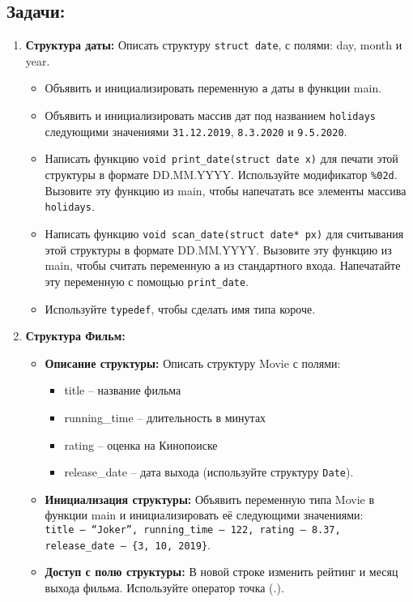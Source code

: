 \documentclass{article}
\begin{document}
\subsection*{Задачи:}
\begin{enumerate}
\item \textbf{Структура даты:} Описать структуру \texttt{struct date}, с полями: day, month и year. 
\begin{itemize}
\item Объявить и инициализировать переменную \texttt{a} даты в функции main.
\item Объявить и инициализировать массив дат под названием \texttt{holidays} следующими значениями \texttt{31.12.2019}, \texttt{8.3.2020} и \texttt{9.5.2020}.
\item Написать функцию \texttt{void print\_date(struct date x)} для печати этой структуры в формате DD.MM.YYYY. Используйте модификатор \texttt{\%02d}. Вызовите эту функцию из main, чтобы напечатать все элементы массива \texttt{holidays}.
\item Написать функцию \texttt{void scan\_date(struct date* px)} для считывания этой структуры в формате DD.MM.YYYY. Вызовите эту функцию из main, чтобы считать переменную \texttt{a} из стандартного входа. Напечатайте эту переменную с помощью \texttt{print\_date}.
\item Используйте \texttt{typedef}, чтобы сделать имя типа короче.
\end{itemize}
\newpage
\item \textbf{Структура Фильм:}
\begin{itemize}
\item \textbf{Описание структуры:} Описать структуру Movie с полями: 
\begin{itemize}
\item title -- название фильма
\item running\_time -- длительность в минутах
\item rating -- оценка на Кинопоиске
\item release\_date -- дата выхода (используйте структуру \texttt{Date}).
\end{itemize}
\item \textbf{Инициализация структуры:} Объявить переменную типа Movie в функции main и инициализировать её следующими значениями:\\
\texttt{title -- ``Joker'', running\_time -- 122, rating -- 8.37, release\_date -- \{3, 10, 2019\}}.
\item \textbf{Доступ с полю структуры:} В новой строке изменить рейтинг и месяц выхода фильма. Используйте оператор точка (.).

\end{itemize}
\end{enumerate}
\end{document}
